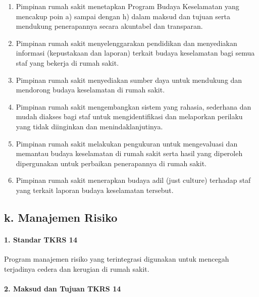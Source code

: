 \documentclass[
]{book}
\providecommand{\tightlist}{%
  \setlength{\itemsep}{0pt}\setlength{\parskip}{0pt}}
\begin{document}
\begin{enumerate}
\def\labelenumi{\alph{enumi}.}
\tightlist
\item
  Pimpinan rumah sakit menetapkan Program Budaya Keselamatan yang mencakup poin a) sampai dengan h) dalam maksud dan tujuan serta mendukung penerapannya secara akuntabel dan transparan.
\item
  Pimpinan rumah sakit menyelenggarakan pendidikan dan menyediakan informasi (kepustakaan dan laporan) terkait budaya keselamatan bagi semua staf yang bekerja di rumah sakit.
\item
  Pimpinan rumah sakit menyediakan sumber daya untuk mendukung dan mendorong budaya keselamatan di rumah sakit.
\item
  Pimpinan rumah sakit mengembangkan sistem yang rahasia, sederhana dan mudah diakses bagi staf untuk mengidentifikasi dan melaporkan perilaku yang tidak diinginkan dan menindaklanjutinya.
\item
  Pimpinan rumah sakit melakukan pengukuran untuk mengevaluasi dan memantau budaya keselamatan di rumah sakit serta hasil yang diperoleh dipergunakan untuk perbaikan penerapannya di rumah sakit.
\item
  Pimpinan rumah sakit menerapkan budaya adil (just culture) terhadap staf yang terkait laporan budaya keselamatan tersebut.
\end{enumerate}

\hypertarget{k.-manajemen-risiko}{%
\subsection*{k. Manajemen Risiko}\label{k.-manajemen-risiko}}

\hypertarget{standar-tkrs-14}{%
\paragraph*{1. Standar TKRS 14}\label{standar-tkrs-14}}

Program manajemen risiko yang terintegrasi digunakan untuk mencegah terjadinya cedera dan kerugian di rumah sakit.

\hypertarget{maksud-dan-tujuan-tkrs-14}{%
\paragraph*{2. Maksud dan Tujuan TKRS 14}\label{maksud-dan-tujuan-tkrs-14}}
\end{document}
